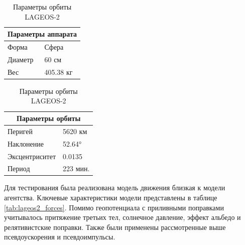 \begin{table}[h!]
    \centering
    \begin{minipage}[t]{0.48\textwidth}
    \centering
    \renewcommand{\arraystretch}{1.5}
    \begin{tabular}{|l|l|}
    \hline
    \multicolumn{2}{|c|}{Параметры аппарата} \\ \hline
    Форма       & Сфера      \\ \hline
    Диаметр     & 60 см      \\ \hline
    Вес         & 405.38 кг  \\ \hline
    \end{tabular}
    \caption{Параметры аппарата LAGEOS-2}
    \label{tab:lageos2}
    \end{minipage}
    \hfill
    \begin{minipage}[t]{0.48\textwidth}
    \centering
    \renewcommand{\arraystretch}{1.5}
    \begin{tabular}{|l|l|}
    \hline
    \multicolumn{2}{|c|}{Параметры орбиты} \\ \hline
    Перигей        & 5620 км   \\ \hline
    Наклонение     & 52.64°    \\ \hline
    Эксцентриситет & 0.0135    \\ \hline
    Период         & 223 мин.  \\ \hline
    \end{tabular}
    \caption{Параметры орбиты LAGEOS-2}
    \label{tab:lageos2_orb}
    \end{minipage}
\end{table}

Для тестирования была реализована модель движения близкая к модели агентства.
Ключевые характеристики модели представлены в таблице \ref{tab:lageos2_forces}.
Помимо геопотенциала с приливными поправками учитывалось притяжение третьих тел,
солнечное давление, эффект альбедо и релятивистские поправки. Также были применены
рассмотренные выше псевдоускорения и псевдоимпульсы. 

